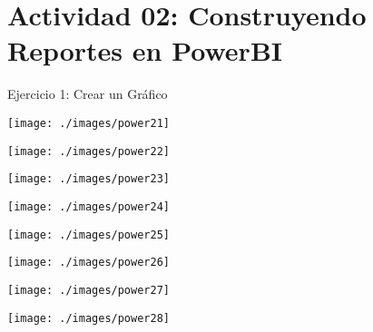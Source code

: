 \section{Actividad 02: Construyendo Reportes en PowerBI} 

Ejercicio 1: Crear un Gráfico \\

	\begin{center}
	\texttt{[image: ./images/power21]}
	\end{center}	

	\begin{center}
	\texttt{[image: ./images/power22]}
	\end{center}	

	\begin{center}
	\texttt{[image: ./images/power23]}
	\end{center}	

	\begin{center}
	\texttt{[image: ./images/power24]}
	\end{center}	

	\begin{center}
	\texttt{[image: ./images/power25]}
	\end{center}	

	\begin{center}
	\texttt{[image: ./images/power26]}
	\end{center}	

	\begin{center}
	\texttt{[image: ./images/power27]}
	\end{center}	

	\begin{center}
	\texttt{[image: ./images/power28]}
	\end{center}	



